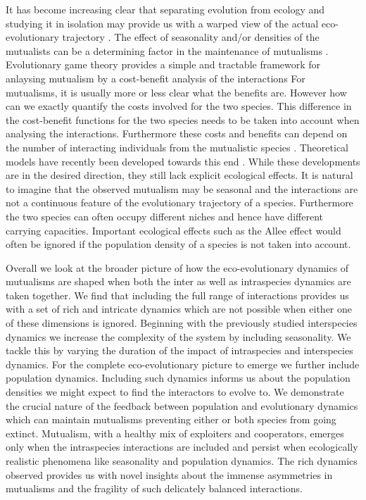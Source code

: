 \documentclass[12pt]{article}
\begin{document}
It has become increasing clear that separating evolution from ecology and studying it in isolation may provide us with a warped view of the actual eco-evolutionary trajectory \citep{sanchez:PLoSB:2013}.
The effect of seasonality and/or densities of the mutualists can be a determining factor in the maintenance of mutualisms \citep{visick:JB:2000,warren:GCB:2014,mcfallngai:PLoSB:2014}.
Evolutionary game theory provides a simple and tractable framework for anlaysing mutualism by a cost-benefit analysis of the interactions \citep{trivers:QRB:1971,weibull:book:1995,hofbauer:JMB:1996,hofbauer:book:1998}
For mutualisms, it is usually more or less clear what the benefits are.
However how can we exactly quantify the costs involved for the two species.
This difference in the cost-benefit functions for the two species needs to be taken into account when analysing the interactions.
Furthermore these costs and benefits can depend on the number of interacting individuals from the mutualistic species \citep{pierce:BES:1987,noe:TREE:1995,hoelldobler:book:1990,hill:OEC:1989,noe:book:2001,kiers:Nature:2003,stanton:AmNat:2003,stadler:book:2008,kiers:Science:2011}. 
Theoretical models have recently been developed towards this end \citep{archetti:EL:2011,archetti:JTB:2013}. 
While these developments are in the desired direction, they still lack explicit ecological effects.
It is natural to imagine that the observed mutualism may be seasonal and the interactions are not a continuous feature of the evolutionary trajectory of a species. 
Furthermore the two species can often occupy different niches and hence have different carrying capacities.
Important ecological effects such as the Allee effect would often be ignored if the population density of a species is not taken into account.


Overall we look at the broader picture of how the eco-evolutionary dynamics of mutualisms are shaped when both the inter as well as intraspecies dynamics are taken together. 
We find that including the full range of interactions provides us with a set of rich and intricate dynamics which are not possible when either one of these dimensions is ignored.
Beginning with the previously studied interspecies dynamics \citep{gokhale:PRSB:2012} we increase the complexity of the system by including seasonality.
We tackle this by varying the duration of the impact of intraspecies and interspecies dynamics.
For the complete eco-evolutionary picture to emerge we further include population dynamics.
Including such dynamics informs us about the population densities we might expect to find the interactors to evolve to.
We demonstrate the crucial nature of the feedback between population and evolutionary dynamics which can maintain mutualisms preventing either or both species from going extinct.
Mutualism, with a healthy mix of exploiters and cooperators, emerges only when the intraspecies interactions are included and persist when ecologically realistic phenomena like seasonality and population dynamics.
The rich dynamics observed provides us with novel insights about the immense asymmetries in mutualisms and the fragility of such delicately balanced interactions.
\end{document}
